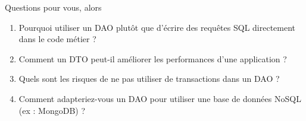 \documentclass[aspectratio=169,10pt]{beamer}
\begin{document}
\begin{frame}{Questions pour vous, alors}
\begin{enumerate}
\item Pourquoi utiliser un DAO plutôt que d’écrire des requêtes SQL directement dans le code métier ?
\item Comment un DTO peut-il améliorer les performances d’une application ?
\item Quels sont les risques de ne pas utiliser de transactions dans un DAO ?
\item Comment adapteriez-vous un DAO pour utiliser une base de données NoSQL (ex : MongoDB) ?

\end{enumerate}
\end{frame}

\rquestionslide
\end{document}
